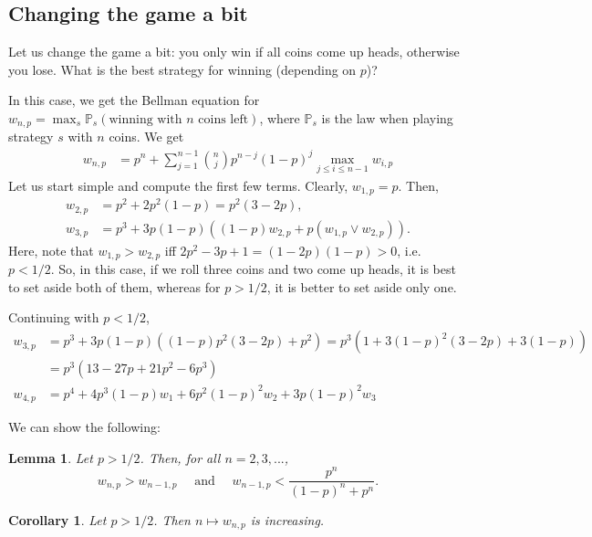 \documentclass{article}
\newtheorem{lemma}[proposition]{Lemma}
\newtheorem{corollary}[proposition]{Corollary}
\theoremstyle{definition}
\theoremstyle{step} \newtheorem{step}{Step}
\begin{document}
\subsection*{Changing the game a bit}
Let us change the game a bit: you only win if all coins come up heads, otherwise you lose. What is the best strategy for winning (depending on $p$)?

In this case, we get the Bellman equation for
$w_{n,p} = \max_s \mathbb P_s(\text{winning with $n$ coins left})$,
where $\mathbb P_s$ is the law when playing strategy $s$ with $n$
coins. We get
\begin{align}\label{eq:wn}
  w_{n,p} & = p^n + \sum_{j=1}^{n-1} \binom n j p^{n-j} (1-p)^j \max_{j\leq i\leq n-1} w_{i,p}
\end{align}
Let us start simple and compute the first few terms. Clearly, $w_{1,p}
= p$. Then,
\begin{align*}
  w_{2,p} & = p^2 + 2p^2(1-p) = p^2(3 - 2p), \\ w_{3,p} & = p^3 +
  3p(1-p)((1-p)w_{2,p} + p (w_{1,p} \vee w_{2,p})).
\end{align*}
Here, note that $w_{1,p} > w_{2,p}$ iff $2p^2 - 3p + 1 = (1 -
2p)(1-p)> 0$, i.e.\ $p < 1/2$. So, in this case, if we roll three
coins and two come up heads, it is best to set aside both of them,
whereas for $p > 1/2$, it is better to set aside only one.

Continuing with $p<1/2$,
\begin{align*}
w_{3,p} & = p^3 + 3p(1-p)((1-p)p^2(3-2p) + p^2) = p^3 (1 + 3(1-p)^2(3-2p) + 3(1-p))\\
& = p^3(13 - 27p + 21p^2 -6 p^3)\\
w_{4,p} & = p^4 + 4p^3(1-p) w_1 + 6p^2(1-p)^2 w_2 + 3p(1-p)^2 w_3
\end{align*}


We can show the following:

\begin{lemma}\label{l1}
  Let $p>1/2$. Then, for all $n=2,3,...$,
  $$ w_{n,p} > w_{n-1,p} \quad \text{ and } \quad w_{n-1,p} <
  \frac{p^n}{(1-p)^n + p^n}.$$
\end{lemma}

\begin{corollary}
  Let $p>1/2$. Then $n\mapsto w_{n,p}$ is increasing.
\end{corollary}
\end{document}

